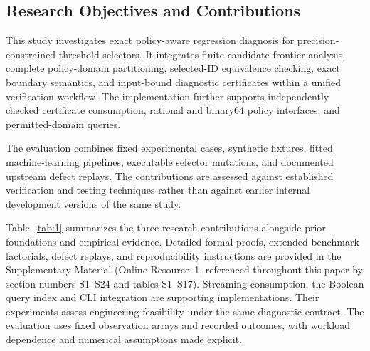 \documentclass[11pt,a4paper]{article}
\begin{document}
\subsection{Research Objectives and Contributions}

This study investigates exact policy-aware regression diagnosis for precision-constrained threshold selectors. It integrates finite candidate-frontier analysis, complete policy-domain partitioning, selected-ID equivalence checking, exact boundary semantics, and input-bound diagnostic certificates within a unified verification workflow. The implementation further supports independently checked certificate consumption, rational and binary64 policy interfaces, and permitted-domain queries.

The evaluation combines fixed experimental cases, synthetic fixtures, fitted machine-learning pipelines, executable selector mutations, and documented upstream defect replays. The contributions are assessed against established verification and testing techniques rather than against earlier internal development versions of the same study.

Table~\ref{tab:1} summarizes the three research contributions alongside prior foundations and empirical evidence. Detailed formal proofs, extended benchmark factorials, defect replays, and reproducibility instructions are provided in the Supplementary Material (Online Resource~1, referenced throughout this paper by section numbers S1--S24 and tables S1--S17). Streaming consumption, the Boolean query index and CLI integration are supporting implementations. Their experiments assess engineering feasibility under the same diagnostic contract. The evaluation uses fixed observation arrays and recorded outcomes, with workload dependence and numerical assumptions made explicit.
\end{document}
